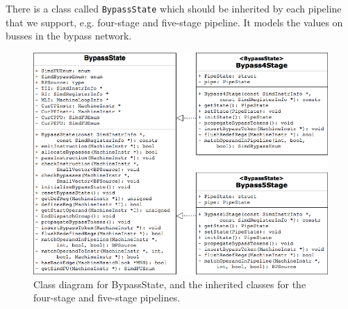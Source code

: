 

There is a class called \texttt{BypassState} which should be inherited by each pipeline that we support, e.g. four-stage and five-stage pipeline. It models the values on busses in the bypass network. %

\begin{figure}[b!]
\centering
\includegraphics[width=\textwidth]{figures/class_diag_bpstate}
\caption{Class diagram for BypassState, and the inherited classes for the four-stage and five-stage pipelines.}
\label{fig:class_diagram_bpstate}
\end{figure}

